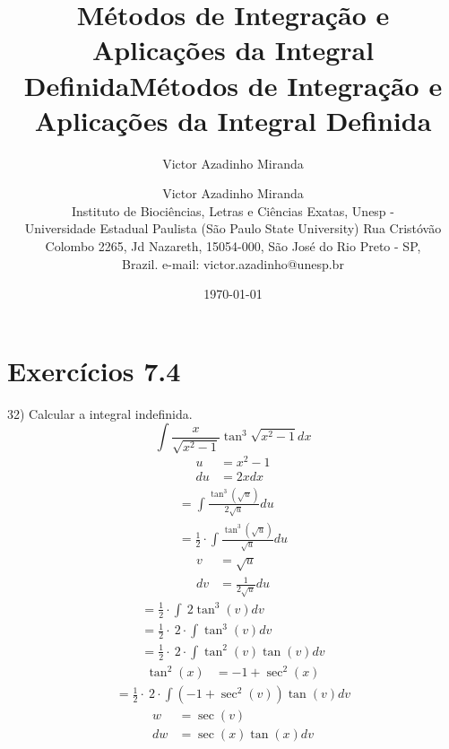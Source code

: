 \documentclass[a4paper,times,12pt]{article}
\title{Métodos de Integração e Aplicações da Integral Definida}
\author{Victor Azadinho Miranda}
\date{\today}
\begin{document}
\title{M\'{e}todos de Integraç\~{a}o e Aplicaç\~{o}es da Integral Definida}
\author{Victor Azadinho Miranda \\ Instituto de Bioci\^{e}ncias, Letras e Ci\^{e}ncias Exatas, Unesp - \\ Universidade Estadual Paulista (S\~{a}o Paulo State University) Rua Crist\'{o}v\~{a}o \\ Colombo 2265, Jd Nazareth, 15054-000, S\~{a}o Jos\'{e} do Rio Preto - SP, \\ Brazil. \quad e-mail: victor.azadinho@unesp.br}
\maketitle
\section{Exerc\'{i}cios 7.4}
\hspace*{+15pt} 32) Calcular a integral indefinida.
\[ \int \frac{x}{\sqrt{x^{2}-1}}\tan^{3}{\sqrt{x^{2}-1}}dx \]
\begin{align*}
	u&=x^2-1 \\
	du&=2xdx
\end{align*}
\begin{gather*}
	=\int \frac{\tan ^3\left(\sqrt{u}\right)}{2\sqrt{u}}du \\
	=\frac{1}{2}\cdot \int \frac{\tan ^3\left(\sqrt{u}\right)}{\sqrt{u}}du
\end{gather*}
\begin{align*}
	v&=\sqrt{u} \\
	dv&=\frac{1}{2\sqrt{u}}du
\end{align*}
\begin{gather*}
	=\frac{1}{2}\cdot \int \:2\tan ^3\left(v\right)dv \\
	=\frac{1}{2}\cdot \:2\cdot \int \tan ^3\left(v\right)dv \\
	=\frac{1}{2}\cdot \:2\cdot \int \tan ^2\left(v\right)\tan \left(v\right)dv
\end{gather*}
\begin{align*}
	\tan ^2\left(x\right)&=-1+\sec ^2\left(x\right)
\end{align*}
\begin{gather*}
	=\frac{1}{2}\cdot \:2\cdot \int \left(-1+\sec ^2\left(v\right)\right)\tan \left(v\right)dv
\end{gather*}
\begin{align*}
	w&=\sec \left(v\right) \\
	dw&=\sec \left(x\right)\tan \left(x\right)dv
\end{align*}
\end{document}
